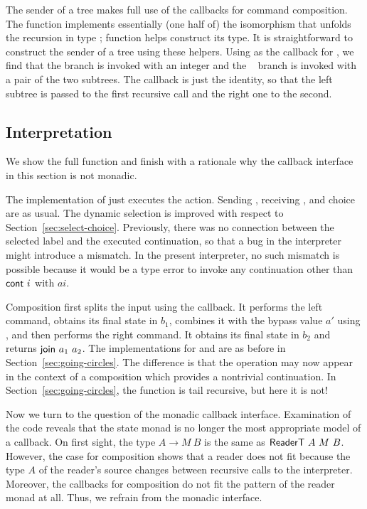 \documentclass[acmsmall,review,anonymous,screen]{acmart}
\begin{document}
The sender of a tree makes full use of the callbacks for command
composition. 
\cstSendTree
The function {\AsplitTree} implements essentially (one half of) the
isomorphism that unfolds the recursion in type {\AIntTree};
function {\AIntTreeF} helps construct its type. It is straightforward
to construct the sender of a tree using these helpers. Using
{\AsplitTree} as the callback for {\ACSELECT}, we find that the
{\Azero} branch is invoked with an integer and the {\Asuc~\Azero}
branch is invoked with a pair of the two subtrees. The {\Asplit}
callback is just the identity, so that the left subtree is passed to
the first recursive call and the right one to the second.

\subsection{Interpretation}
\label{sec:interpretation}


We show the full {\Aexecutor} function and finish with a rationale why
the callback interface in this section is not monadic.
\cstExec

The implementation of {\ACSKIP} just executes the action.
Sending  {\ACSEND}, receiving  {\ACRECV}, and choice {\ACCHOICE} are as usual.
The dynamic selection is improved with respect to
Section~\ref{sec:select-choice}. Previously, there was no connection
between the selected label and the executed continuation, so that a
bug in the interpreter might introduce a mismatch. In the present
interpreter, no such mismatch is possible because it would be a type
error to invoke any continuation other than $\Acont~i$ with $ai$.

Composition first splits the input using the {\Asplit} callback. It performs the left command, obtains its final state in
$b_1$, combines it with the bypass value $a'$ using {\Across}, and
then performs the right command. It obtains its final state in
$b_2$ and returns $\Ajoin~a_1~a_2$.
The implementations for {\AMU} and {\ACONTINUE} are as before in
Section~\ref{sec:going-circles}. The difference is that the
{\ACONTINUE} operation may now appear in the context of a composition
which provides a nontrivial continuation. In
Section~\ref{sec:going-circles}, the function {\Aexecutor} is tail
recursive, but here it is not!

Now we turn to the question of the monadic callback interface. 
Examination of the code reveals that the state monad is no longer the most appropriate model of a
callback. On first sight, the type $A \to 
M~B$ is the same as $\AReaderT~A~M~B $. However, the case 
for composition shows that a reader does not fit because
the type $A$ of the reader's source changes between recursive calls to
the interpreter. Moreover, the callbacks for composition do not fit
the pattern of the reader monad at all.
Thus, we refrain from the monadic interface.
\end{document}
